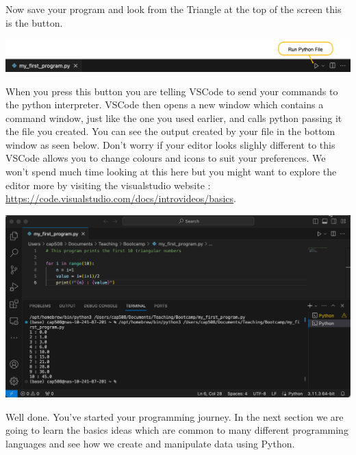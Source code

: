Now save your program and look from the Triangle at the top of the screen this is the  button.

\begin{centering}
    \includegraphics[width=1.0\linewidth]{VSCode-Run.png}
\end{centering}

When you press this button you are telling VSCode to send your commands to the python interpreter. VSCode then opens a new window which contains a command window, just like the one you used earlier, and calls python passing it the file you created. You can see the output created by your file in the bottom window as seen below. Don't worry if your editor looks slighly different to this VSCode allows you to change colours and icons to suit your preferences. We won't spend much time looking at this here but you might want to explore the editor more by visiting the visualstudio website : \url{https://code.visualstudio.com/docs/introvideos/basics}.

\begin{center}
    \includegraphics[width=1.0\linewidth]{images/screenshots/VSCodeEnv.png}
\end{center}

Well done. You've started your programming journey. In the next section we are going to learn the basics ideas which are common to many different programming languages and see how we create and manipulate data using Python.

%

